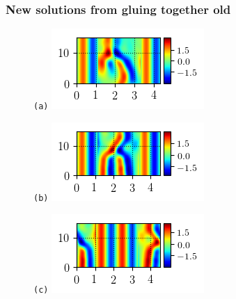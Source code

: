 \documentclass[mathserif, handout]{beamer}
\begin{document}
\begin{frame}
\frametitle{New solutions from gluing together old}
\begin{figure}
\begin{minipage}[height=.20\textheight]{.5\textwidth}
\centering \small{\texttt{(a)}}
\includegraphics[width=.7\textwidth,height=.15\textheight]{MNG_ppo_subdomain2_1}
\end{minipage}
\begin{minipage}[height=.20\textheight]{.5\textwidth}
\centering \small{\texttt{(b)}}
\includegraphics[width=.7\textwidth,height=.15\textheight]{MNG_ppo_subdomain1_1}
\end{minipage}
\begin{minipage}[height=.20\textheight]{.5\textwidth}
\centering \small{\texttt{(c)}}
\includegraphics[width=.7\textwidth,height=.15\textheight]{MNG_ppo_subdomain0_1}
\end{minipage}
\end{figure}
\end{frame}
\end{document}
